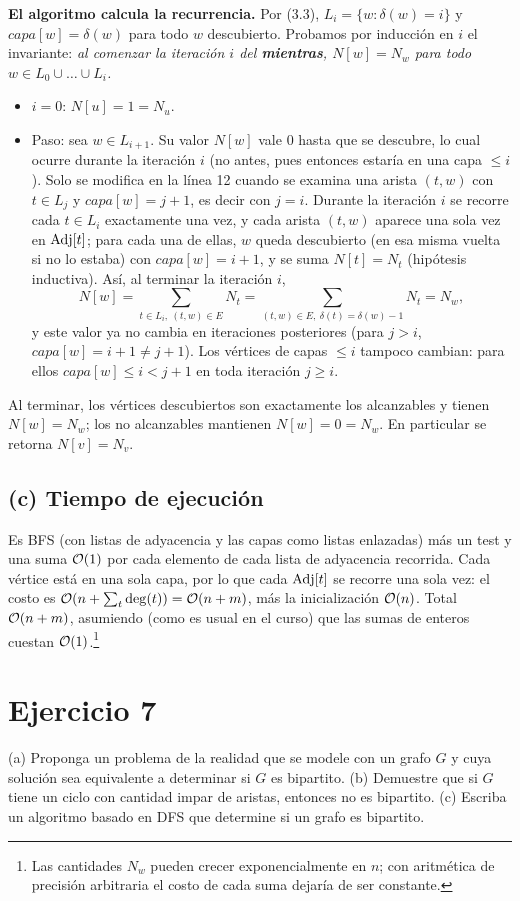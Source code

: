 \textbf{El algoritmo calcula la recurrencia.} Por (3.3), $L_i=\{w:\delta(w)=i\}$ y $capa[w]=\delta(w)$
para todo $w$ descubierto. Probamos por inducción en $i$ el invariante: \emph{al comenzar la iteración $i$
del \textbf{mientras}, $N[w]=N_w$ para todo $w\in L_0\cup\dots\cup L_i$.}
\begin{itemize}
\item $i=0$: $N[u]=1=N_u$.
\item Paso: sea $w\in L_{i+1}$. Su valor $N[w]$ vale 0 hasta que se descubre, lo cual ocurre durante la
iteración $i$ (no antes, pues entonces estaría en una capa $\le i$). Solo se modifica en la línea 12
cuando se examina una arista $(t,w)$ con $t\in L_j$ y $capa[w]=j+1$, es decir con $j=i$. Durante la
iteración $i$ se recorre cada $t\in L_i$ exactamente una vez, y cada arista $(t,w)$ aparece una sola
vez en $\mathrm{Adj}[t]$; para cada una de ellas, $w$ queda descubierto (en esa misma vuelta si no lo estaba) con
$capa[w]=i+1$, y se suma $N[t]=N_t$ (hipótesis inductiva). Así, al terminar la iteración $i$,
\[N[w]=\sum_{t\in L_i,\ (t,w)\in E}N_t=\sum_{(t,w)\in E,\ \delta(t)=\delta(w)-1}N_t=N_w,\]
y este valor ya no cambia en iteraciones posteriores (para $j>i$, $capa[w]=i+1\ne j+1$). Los vértices de
capas $\le i$ tampoco cambian: para ellos $capa[w]\le i<j+1$ en toda iteración $j\ge i$.
\end{itemize}
Al terminar, los vértices descubiertos son exactamente los alcanzables y tienen $N[w]=N_w$; los no
alcanzables mantienen $N[w]=0=N_w$. En particular se retorna $N[v]=N_v$.

\subsection*{(c) Tiempo de ejecución}
Es BFS (con listas de adyacencia y las capas como listas enlazadas) más un test y una suma $\mathcal{O}(1)$ por
cada elemento de cada lista de adyacencia recorrida. Cada vértice está en una sola capa, por lo que
cada $\mathrm{Adj}[t]$ se recorre una sola vez: el costo es $\mathcal{O}(n+\sum_t\deg(t))=\mathcal{O}(n+m)$, más la
inicialización $\mathcal{O}(n)$. Total $\mathcal{O}(n+m)$, asumiendo (como es usual en el curso) que las sumas de
enteros cuestan $\mathcal{O}(1)$.\footnote{Las cantidades $N_w$ pueden crecer exponencialmente en $n$; con
aritmética de precisión arbitraria el costo de cada suma dejaría de ser constante.}

\section{Ejercicio 7}
\begin{enunciado}
(a) Proponga un problema de la realidad que se modele con un grafo $G$ y cuya solución sea equivalente
a determinar si $G$ es bipartito.
(b) Demuestre que si $G$ tiene un ciclo con cantidad impar de aristas, entonces no es bipartito.
(c) Escriba un algoritmo basado en DFS que determine si un grafo es bipartito.
\end{enunciado}

